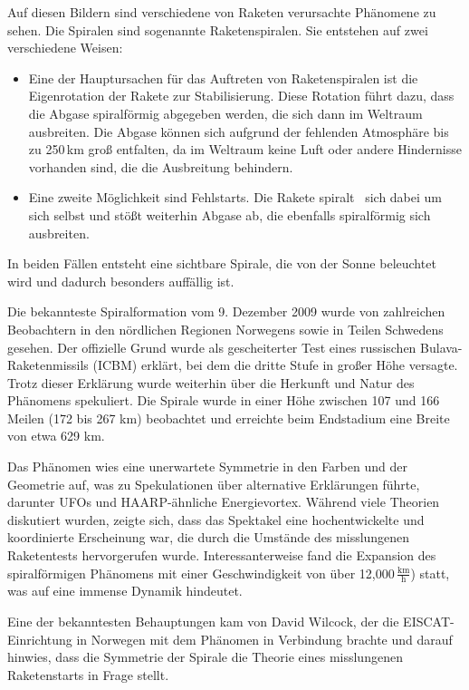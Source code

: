 \documentclass{scrartcl}
\begin{document}
Auf diesen Bildern sind verschiedene von Raketen verursachte Phänomene zu sehen. Die Spiralen sind sogenannte Raketenspiralen. Sie entstehen auf zwei verschiedene Weisen:


\begin{itemize}
    \item Eine der Hauptursachen für das Auftreten von Raketenspiralen ist die Eigenrotation der Rakete zur Stabilisierung. Diese Rotation führt dazu, dass die Abgase spiralförmig abgegeben werden, die sich dann im Weltraum ausbreiten. Die Abgase können sich aufgrund der fehlenden Atmosphäre bis zu 250\,km groß entfalten, da im Weltraum keine Luft oder andere Hindernisse vorhanden sind, die die Ausbreitung behindern. 
    \item Eine zweite Möglichkeit sind Fehlstarts. Die Rakete \flq spiralt \frq\ sich dabei um sich selbst und stößt weiterhin Abgase ab, die ebenfalls spiralförmig sich ausbreiten.
\end{itemize}

In beiden Fällen entsteht eine sichtbare Spirale, die von der Sonne beleuchtet wird und dadurch besonders auffällig ist.

Die bekannteste Spiralformation vom 9. Dezember 2009 wurde von zahlreichen Beobachtern in den nördlichen Regionen Norwegens sowie in Teilen Schwedens gesehen. Der offizielle Grund wurde als gescheiterter Test eines russischen Bulava-Raketenmissils (ICBM) erklärt, bei dem die dritte Stufe in großer Höhe versagte. Trotz dieser Erklärung wurde weiterhin über die Herkunft und Natur des Phänomens spekuliert. Die Spirale wurde in einer Höhe zwischen 107 und 166 Meilen (172 bis 267 km) beobachtet und erreichte beim Endstadium eine Breite von etwa 629 km.

Das Phänomen wies eine unerwartete Symmetrie in den Farben und der Geometrie auf, was zu Spekulationen über alternative Erklärungen führte, darunter UFOs und HAARP-ähnliche Energievortex. Während viele Theorien diskutiert wurden, zeigte sich, dass das Spektakel eine hochentwickelte und koordinierte Erscheinung war, die durch die Umstände des misslungenen Raketentests hervorgerufen wurde. Interessanterweise fand die Expansion des spiralförmigen Phänomens mit einer Geschwindigkeit von über 12,000\,$\frac{\text{km}}{\text{h}}$) statt, was auf eine immense Dynamik hindeutet.

Eine der bekanntesten Behauptungen kam von David Wilcock, der die EISCAT-Einrichtung in Norwegen mit dem Phänomen in Verbindung brachte und darauf hinwies, dass die Symmetrie der Spirale die Theorie eines misslungenen Raketenstarts in Frage stellt. 
\end{document}
